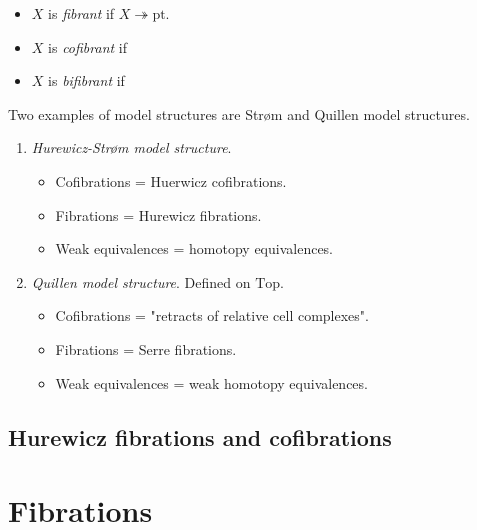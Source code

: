 \begin{definition} 
\begin{itemize}
\item $X$ is {\it fibrant} if $X\twoheadrightarrow\text{pt}$.
\item $X$ is {\it cofibrant} if 
\item $X$ is {\it bifibrant} if 
\end{itemize}
\end{definition}

\medskip\noindent
Two examples of model structures
are Str\o m and Quillen model structures.

\begin{example} 
\begin{enumerate}
\item {\it Hurewicz-Str\o m model structure}.
\begin{itemize}
\item Cofibrations = Huerwicz cofibrations.
\item Fibrations = Hurewicz fibrations.
\item Weak equivalences = homotopy equivalences.
\end{itemize}
\item {\it Quillen model structure}. Defined on $\text{Top}$.
\begin{itemize}
\item Cofibrations = "retracts of relative cell complexes".
\item Fibrations = Serre fibrations.
\item Weak equivalences = weak homotopy equivalences.
\end{itemize}
\end{enumerate}
\end{example}

\subsection{Hurewicz fibrations and cofibrations}

\section{Fibrations}

